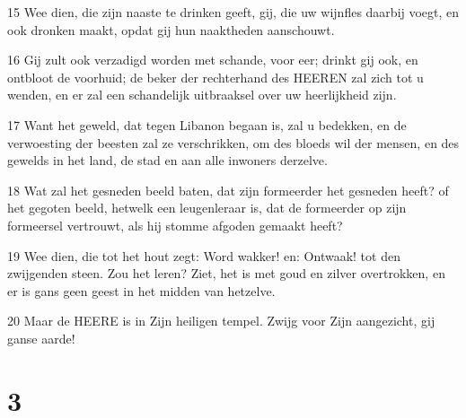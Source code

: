 \par 15 Wee dien, die zijn naaste te drinken geeft, gij, die uw wijnfles daarbij voegt, en ook dronken maakt, opdat gij hun naaktheden aanschouwt.
\par 16 Gij zult ook verzadigd worden met schande, voor eer; drinkt gij ook, en ontbloot de voorhuid; de beker der rechterhand des HEEREN zal zich tot u wenden, en er zal een schandelijk uitbraaksel over uw heerlijkheid zijn.
\par 17 Want het geweld, dat tegen Libanon begaan is, zal u bedekken, en de verwoesting der beesten zal ze verschrikken, om des bloeds wil der mensen, en des gewelds in het land, de stad en aan alle inwoners derzelve.
\par 18 Wat zal het gesneden beeld baten, dat zijn formeerder het gesneden heeft? of het gegoten beeld, hetwelk een leugenleraar is, dat de formeerder op zijn formeersel vertrouwt, als hij stomme afgoden gemaakt heeft?
\par 19 Wee dien, die tot het hout zegt: Word wakker! en: Ontwaak! tot den zwijgenden steen. Zou het leren? Ziet, het is met goud en zilver overtrokken, en er is gans geen geest in het midden van hetzelve.
\par 20 Maar de HEERE is in Zijn heiligen tempel. Zwijg voor Zijn aangezicht, gij ganse aarde!

\chapter{3}

